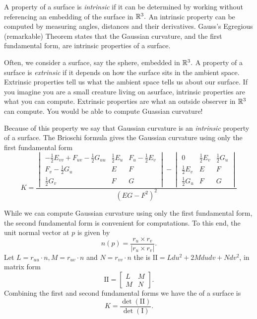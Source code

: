 A property of a surface is \emph{intrinsic} if it can be determined by working without referencing
an embedding of the surface in $\mathbb{R}^3.$ An intrinsic property can be computed by measuring angles,
distances and their derivatives.
Gauss's Egregious (remarkable) Theorem states that the Gaussian curvature, and the first fundamental form, are intrinsic properties of a surface.

Often, we consider a surface, say the sphere, embedded in $\mathbb{R}^3.$ A property of a surface is
\emph{extrinsic} if it depends on how the surface sits in the ambient space. Extrinsic properties
tell us what the ambient space tells us about our surface. If you imagine you are a small
creature living on asurface, intrinsic properties are what you can compute. Extrinsic properties
are what an outside observer in $\mathbb{R}^3$ can compute. You would be able to compute Guassian
curvature!



Because of this property we say that Gaussian curvature is an \emph{intrinsic} property of a surface.
The Brioschi formula gives the Gaussian curvature using only the first fundamental form
\begin{equation}\label{eq:brioschi}
	K=\frac{\begin{vmatrix}
-\frac{1}{2}E_{vv}+F_{uv}-\frac{1}{2}G_{uu} & \frac{1}{2}E_u & F_u-\frac{1}{2}E_v\\
F_v-\frac{1}{2}G_u & E & F\\
\frac{1}{2}G_v & F & G
\end{vmatrix}-\begin{vmatrix}
0 & \frac{1}{2}E_v & \frac{1}{2}G_u\\
\frac{1}{2}E_v & E & F\\
\frac{1}{2}G_u & F & G
\end{vmatrix}}{(EG-F^2)^2}
\end{equation}



While we can compute Gaussian curvature using only the first fundamental form,
 the second fundamental form is convenient for computations.
To this end, the unit normal vector at $p$ is given by $$n(p)=\frac{r_u\times r_v}{|r_u\times r_v|}.$$
Let $L=r_{uu}\cdot n, M=r_{uv}\cdot n$ and $N=r_{vv}\cdot n$ the
 is $\mathrm{I\!I}=Ldu^2+2Mdudv+Ndv^2$,
in matrix form $$\mathrm{I\!I}=\begin{bmatrix}
L & M \\
M & N 
\end{bmatrix}.$$
Combining the first and second fundamental forms we have
the  of a surface is
\begin{equation}\label{eqn:curve-dets}
 	K=\frac{\det(\mathrm{I\!I})}{\det(\mathrm{I})}.
\end{equation}


